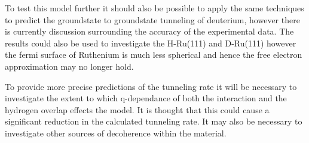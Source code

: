 To test
this model further
it should also be possible
to apply the same
techniques
to predict the
groundstate to
groundstate tunneling
of deuterium, however
there is currently
discussion
surrounding the
accuracy of the
experimental data.
The results could
also be used to
investigate the
H-Ru(111) and D-Ru(111) %
however the fermi
surface of Ruthenium
is much less spherical
and hence
the free electron
approximation may
no longer hold.

To provide more precise
predictions of the
tunneling rate
it will be necessary
to investigate the
extent to which q-dependance
of both the interaction
and the hydrogen overlap
effects the model. It is thought
that this could cause a
significant reduction in
the calculated tunneling
rate. It may also be necessary
to investigate other
sources of decoherence
within the material.